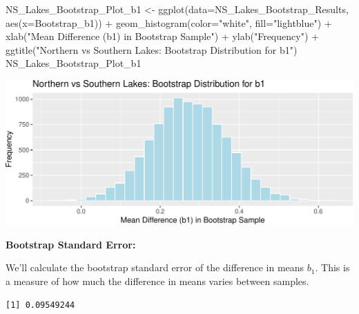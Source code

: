 \documentclass[
  letterpaper,
  DIV=11,
  numbers=noendperiod]{scrreprt}
\newenvironment{Shaded}{\begin{snugshade}}{\end{snugshade}}
\newcommand{\AttributeTok}[1]{\textcolor[rgb]{0.40,0.45,0.13}{#1}}
\newcommand{\FunctionTok}[1]{\textcolor[rgb]{0.28,0.35,0.67}{#1}}
\newcommand{\NormalTok}[1]{\textcolor[rgb]{0.00,0.23,0.31}{#1}}
\newcommand{\OtherTok}[1]{\textcolor[rgb]{0.00,0.23,0.31}{#1}}
\newcommand{\SpecialCharTok}[1]{\textcolor[rgb]{0.37,0.37,0.37}{#1}}
\newcommand{\StringTok}[1]{\textcolor[rgb]{0.13,0.47,0.30}{#1}}
\begin{document}
\begin{Shaded}
\begin{Highlighting}[]
\NormalTok{NS\_Lakes\_Bootstrap\_Plot\_b1 }\OtherTok{\textless{}{-}} \FunctionTok{ggplot}\NormalTok{(}\AttributeTok{data=}\NormalTok{NS\_Lakes\_Bootstrap\_Results, }\FunctionTok{aes}\NormalTok{(}\AttributeTok{x=}\NormalTok{Bootstrap\_b1)) }\SpecialCharTok{+}  
  \FunctionTok{geom\_histogram}\NormalTok{(}\AttributeTok{color=}\StringTok{"white"}\NormalTok{, }\AttributeTok{fill=}\StringTok{"lightblue"}\NormalTok{) }\SpecialCharTok{+} 
  \FunctionTok{xlab}\NormalTok{(}\StringTok{"Mean Difference (b1) in Bootstrap Sample"}\NormalTok{) }\SpecialCharTok{+} \FunctionTok{ylab}\NormalTok{(}\StringTok{"Frequency"}\NormalTok{) }\SpecialCharTok{+}
  \FunctionTok{ggtitle}\NormalTok{(}\StringTok{"Northern vs Southern Lakes: Bootstrap Distribution for b1"}\NormalTok{) }
\NormalTok{NS\_Lakes\_Bootstrap\_Plot\_b1}
\end{Highlighting}
\end{Shaded}

\includegraphics{Ch3_files/figure-pdf/unnamed-chunk-111-1.pdf}

\textbf{Bootstrap Standard Error:}

We'll calculate the bootstrap standard error of the difference in means
\(b_1\). This is a measure of how much the difference in means varies
between samples.

\begin{Shaded}
\end{Shaded}

\begin{verbatim}
[1] 0.09549244
\end{verbatim}
\end{document}
